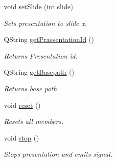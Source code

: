 \begin{DoxyCompactItemize}
void \hyperlink{class_praesentation_a444d2cc623f1dbc138812e5db7e43da9}{set\+Slide} (int slide)
\begin{DoxyCompactList}\small\item\em Sets presentation to slide x. \end{DoxyCompactList}\item 
Q\+String \hyperlink{class_praesentation_afa00aae450003f72222f1fa8cea6fac0}{get\+Praesentation\+Id} ()
\begin{DoxyCompactList}\small\item\em Returns Presentation id. \end{DoxyCompactList}\item 
Q\+String \hyperlink{class_praesentation_a8e6f1a6f7b87ec6154501a03c0b8e6d0}{get\+Basepath} ()
\begin{DoxyCompactList}\small\item\em Returns base path. \end{DoxyCompactList}\item 
void \hyperlink{class_praesentation_a16fd49d6e8cc2f32cdaa79dae99a0916}{reset} ()
\begin{DoxyCompactList}\small\item\em Resets all members. \end{DoxyCompactList}\item 
void \hyperlink{class_praesentation_a0acd65f9f1a8ff1f57ca9fe461b5fcd3}{stop} ()
\begin{DoxyCompactList}\small\item\em Stops presentation and emits signal. \end{DoxyCompactList}\end{DoxyCompactItemize}
